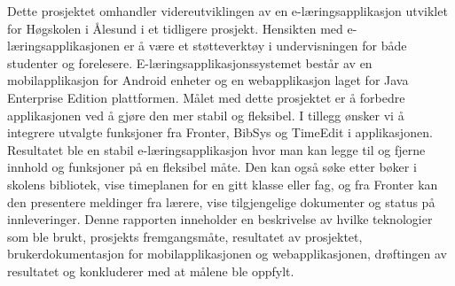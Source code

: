 \documentclass[../main.tex]{subfiles}
\begin{document}
Dette prosjektet omhandler videreutviklingen av en e-læringsapplikasjon utviklet for Høgskolen i Ålesund i et tidligere prosjekt. Hensikten med e-læringsapplikasjonen er å være et støtteverktøy i undervisningen for både studenter og forelesere.\newline
E-læringsapplikasjonssystemet består av en mobilapplikasjon for Android enheter og en webapplikasjon laget for Java Enterprise Edition plattformen.\newline
\newline
Målet med dette prosjektet er å forbedre applikasjonen ved å gjøre den mer stabil og fleksibel. I tillegg ønsker vi å integrere utvalgte funksjoner fra Fronter, BibSys og TimeEdit i applikasjonen.\newline
\newline
Resultatet ble en stabil e-læringsapplikasjon hvor man kan legge til og fjerne innhold og funksjoner på en fleksibel måte. Den kan også søke etter bøker i skolens bibliotek, vise timeplanen for en gitt klasse eller fag, og fra Fronter kan den presentere meldinger fra lærere, vise tilgjengelige dokumenter og status på innleveringer.\newline
\newline
Denne rapporten inneholder en beskrivelse av hvilke teknologier som ble brukt, prosjekts fremgangsmåte, resultatet av prosjektet, brukerdokumentasjon for mobilapplikasjonen og webapplikasjonen, drøftingen av resultatet og konkluderer med at målene ble oppfylt.\newline
\end{document}
